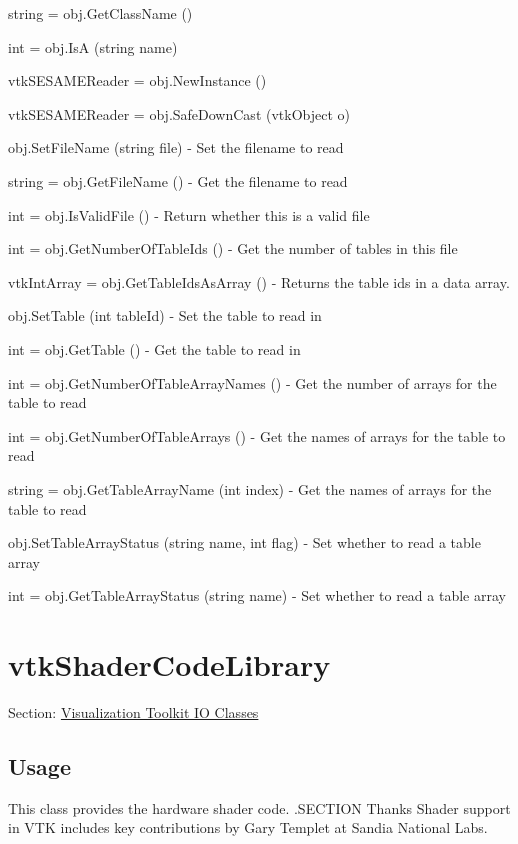 \begin{DoxyItemize}
\item {\ttfamily string = obj.\-Get\-Class\-Name ()}  
\item {\ttfamily int = obj.\-Is\-A (string name)}  
\item {\ttfamily vtk\-S\-E\-S\-A\-M\-E\-Reader = obj.\-New\-Instance ()}  
\item {\ttfamily vtk\-S\-E\-S\-A\-M\-E\-Reader = obj.\-Safe\-Down\-Cast (vtk\-Object o)}  
\item {\ttfamily obj.\-Set\-File\-Name (string file)} -\/ Set the filename to read  
\item {\ttfamily string = obj.\-Get\-File\-Name ()} -\/ Get the filename to read  
\item {\ttfamily int = obj.\-Is\-Valid\-File ()} -\/ Return whether this is a valid file  
\item {\ttfamily int = obj.\-Get\-Number\-Of\-Table\-Ids ()} -\/ Get the number of tables in this file  
\item {\ttfamily vtk\-Int\-Array = obj.\-Get\-Table\-Ids\-As\-Array ()} -\/ Returns the table ids in a data array.  
\item {\ttfamily obj.\-Set\-Table (int table\-Id)} -\/ Set the table to read in  
\item {\ttfamily int = obj.\-Get\-Table ()} -\/ Get the table to read in  
\item {\ttfamily int = obj.\-Get\-Number\-Of\-Table\-Array\-Names ()} -\/ Get the number of arrays for the table to read  
\item {\ttfamily int = obj.\-Get\-Number\-Of\-Table\-Arrays ()} -\/ Get the names of arrays for the table to read  
\item {\ttfamily string = obj.\-Get\-Table\-Array\-Name (int index)} -\/ Get the names of arrays for the table to read  
\item {\ttfamily obj.\-Set\-Table\-Array\-Status (string name, int flag)} -\/ Set whether to read a table array  
\item {\ttfamily int = obj.\-Get\-Table\-Array\-Status (string name)} -\/ Set whether to read a table array  
\end{DoxyItemize}\hypertarget{vtkio_vtkshadercodelibrary}{}\section{vtk\-Shader\-Code\-Library}\label{vtkio_vtkshadercodelibrary}
Section\-: \hyperlink{sec_vtkio}{Visualization Toolkit I\-O Classes} \hypertarget{vtkwidgets_vtkxyplotwidget_Usage}{}\subsection{Usage}\label{vtkwidgets_vtkxyplotwidget_Usage}
This class provides the hardware shader code. .S\-E\-C\-T\-I\-O\-N Thanks Shader support in V\-T\-K includes key contributions by Gary Templet at Sandia National Labs.

